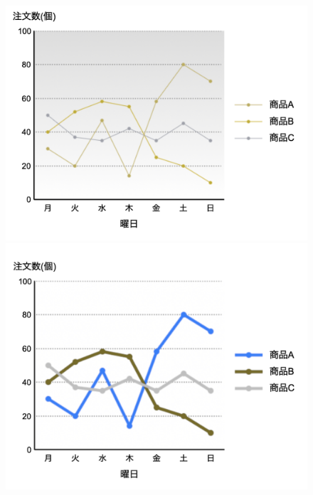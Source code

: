 \begin{figure}[H]
    \begin{minipage}[b]{.49\columnwidth}
        \centering
        \includegraphics[keepaspectratio,width=\textwidth]{../../10_UniversalDesign/no2_line_CC_P.png}
    \end{minipage}
    \begin{minipage}[b]{.49\columnwidth}
        \centering
        \includegraphics[keepaspectratio,width=\textwidth]{../../10_UniversalDesign/no2_line_RC_P.png}
    \end{minipage}
    \begin{minipage}[b]{.49\columnwidth}

\end{minipage}
\end{figure}
